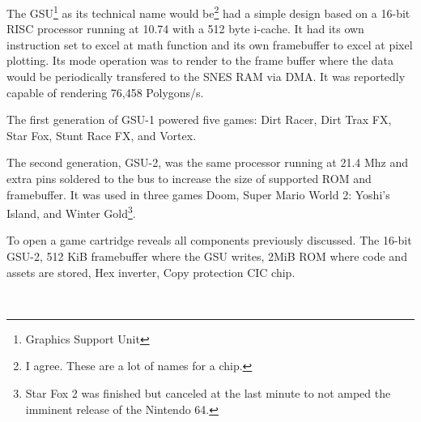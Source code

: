 \par
The GSU\footnote{Graphics Support Unit} as its technical name would be\footnote{I agree. These are a lot of names for a chip.} had a simple design based on a 16-bit RISC processor running at 10.74 with a 512 byte i-cache. It had its own instruction set to excel at math function and its own framebuffer to excel at pixel plotting. Its mode operation was to render to the frame buffer where the data would be periodically transfered to the SNES RAM via DMA. It was reportedly capable of rendering 76,458 Polygons/s.\\

\par
The first generation of GSU-1 powered five games: Dirt Racer, Dirt Trax FX, Star Fox, Stunt Race FX, and Vortex.\\
\par
 The second generation, GSU-2, was the same processor running at 21.4 Mhz and extra pins soldered to the bus to increase the size of supported ROM and framebuffer. It was used in three games Doom, Super Mario World 2: Yoshi's Island, and Winter Gold\footnote{Star Fox 2 was finished but canceled at the last minute to not amped the imminent release of the Nintendo 64.}.\\
\par
To open a \doom game cartridge reveals all components previously discussed.  The 16-bit GSU-2,  512 KiB framebuffer where the GSU writes,  2MiB ROM where code and assets are stored,  Hex inverter,  Copy protection CIC chip.







\\
\par

